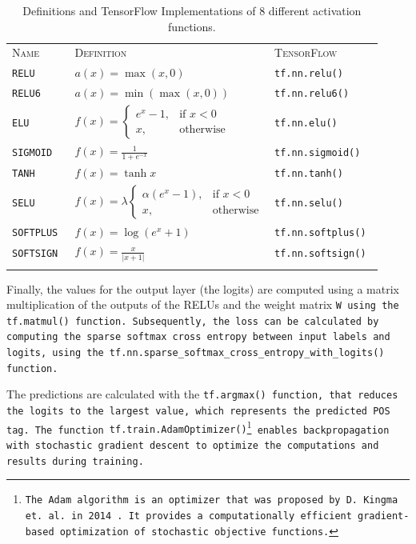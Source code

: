 \begin{table}[!ht]
	\centering\small{}\begin{tabular}{ p{23mm} p{62mm} l }
	\trule
	\textsc{Name} & \textsc{Definition} & \textsc{TensorFlow} \\
	\srule
	\tt{RELU} & $a(x)=\max(x,0)$ & \tt{tf.nn.relu()} \\
	\midrule
	\tt{RELU6} & $a(x)=\min(\max(x,0))$ & \tt{tf.nn.relu6()} \\
	\midrule
	\tt{ELU} & $f(x)=\begin{cases}e^x-1,& \text{if } x<0\\x, & \text{otherwise}\end{cases}$ & \tt{tf.nn.elu()} \\
	\midrule
	\tt{SIGMOID} & $f(x)=\frac{1}{1+e^{-x}} $ & \tt{tf.nn.sigmoid()} \\
	\midrule
	\tt{TANH} & $f(x)=\tanh{x} $ & \tt{tf.nn.tanh()} \\
	\midrule
	\tt{SELU} & $f(x)=\lambda\begin{cases}\alpha (e^x-1),& \text{if } x<0\\x, & \text{otherwise}\end{cases} $ & \tt{tf.nn.selu()} \\
	\midrule
	\tt{SOFTPLUS} & $f(x)=\log{(e^x+1)} $ & \tt{tf.nn.softplus()} \\
	\midrule
	\tt{SOFTSIGN} & $f(x)=\frac{x}{|x+1|} $ & \tt{tf.nn.softsign()} \\
	\brule
	\end{tabular}
	\vspace{.8em}
	\caption[Activation Functions]{Definitions and TensorFlow Implementations of 8 different activation functions.}
	\label{t.postagging.activation}
\end{table}

Finally, the values for the output layer (the logits) are computed using a matrix multiplication of the outputs of the RELUs and the weight matrix \tt{W} using the \tt{tf.matmul()} function. Subsequently, the loss can be calculated by computing the sparse softmax cross entropy between input labels and logits, using the \tt{tf.nn.sparse\_softmax\_cross\_entropy\_with\_logits()} function.

The predictions are calculated with the \tt{tf.argmax()} function, that reduces the logits to the largest value, which represents the predicted POS tag. The function \tt{tf.train.AdamOptimizer()}\footnote{The Adam algorithm is an optimizer that was proposed by D. Kingma et. al. in 2014 \cite{kingma2014}. It provides a computationally efficient gradient-based optimization of stochastic objective functions.} enables backpropagation with stochastic gradient descent to optimize the computations and results during training.


